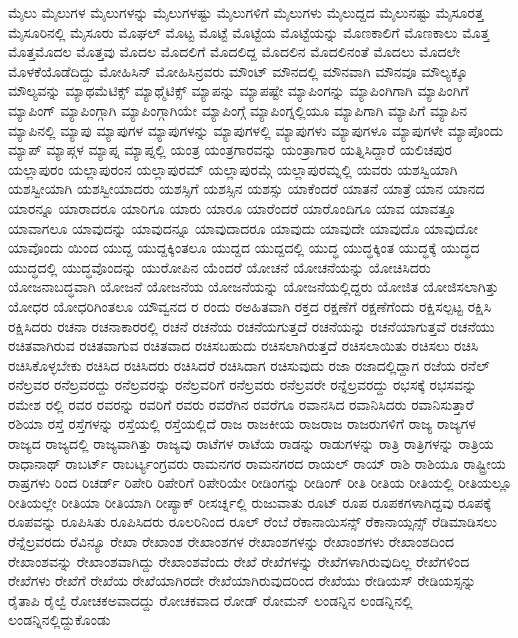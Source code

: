 {ಮೈಲು
ಮೈಲುಗಳ
ಮೈಲುಗಳನ್ನು
ಮೈಲುಗಳಷ್ಟು
ಮೈಲುಗಳಿಗೆ
ಮೈಲುಗಳು
ಮೈಲುದ್ದದ
ಮೈಲುನಷ್ಟು
ಮೈಸೂರತ್ತ
ಮೈಸೂರಿನಲ್ಲಿ
ಮೈಸೂರು
ಮೊಘಲ್
ಮೊಟ್ಟ
ಮೊಟ್ಟೆ
ಮೊಟ್ಟೆಯ
ಮೊಟ್ಟೆಯನ್ನು
ಮೊಣಕಾಲಿಗೆ
ಮೊಣಕಾಲು
ಮೊತ್ತ
ಮೊತ್ತಮೊದಲ
ಮೊತ್ತವು
ಮೊದಲ
ಮೊದಲಿಗೆ
ಮೊದಲಿದ್ದ
ಮೊದಲಿನ
ಮೊದಲಿನಂತೆ
ಮೊದಲು
ಮೊದಲೇ
ಮೊಳಕೆಯೊಡೆದಿದ್ದು
ಮೋಹಿಸಿನ್
ಮೋಹಿಸಿನ್ರವರು
ಮೌಂಟ್
ಮೌನದಲ್ಲಿ
ಮೌನವಾಗಿ
ಮೌನವೂ
ಮೌಲ್ಯಕ್ಕೂ
ಮೌಲ್ಯವನ್ನು
ಮ್ಯಾಥಮೆಟಿಕ್ಸ್
ಮ್ಯಾಥ್ಮೆಟಿಕ್ಸ್
ಮ್ಯಾಪನ್ನು
ಮ್ಯಾಪಷ್ಟೇ
ಮ್ಯಾಪಿಂಗನ್ನು
ಮ್ಯಾಪಿಂಗಿಗಾಗಿ
ಮ್ಯಾಪಿಂಗಿಗೆ
ಮ್ಯಾಪಿಂಗ್
ಮ್ಯಾಪಿಂಗ್ಗಾಗಿ
ಮ್ಯಾಪಿಂಗ್ಗಾಗಿಯೇ
ಮ್ಯಾಪಿಂಗ್ಗೆ
ಮ್ಯಾಪಿಂಗ್ನಲ್ಲಿಯೂ
ಮ್ಯಾಪಿಗಾಗಿ
ಮ್ಯಾಪಿಗೆ
ಮ್ಯಾಪಿನ
ಮ್ಯಾಪಿನಲ್ಲಿ
ಮ್ಯಾಪು
ಮ್ಯಾಪುಗಳ
ಮ್ಯಾಪುಗಳನ್ನು
ಮ್ಯಾಪುಗಳಲ್ಲಿ
ಮ್ಯಾಪುಗಳು
ಮ್ಯಾಪುಗಳೂ
ಮ್ಯಾಪುಗಳೇ
ಮ್ಯಾಪೊಂದು
ಮ್ಯಾಪ್
ಮ್ಯಾಪ್ಗಳ
ಮ್ಯಾಪ್ನ
ಮ್ಯಾಪ್ನಲ್ಲಿ
ಯಂತ್ರ
ಯಂತ್ರಗಾರವನ್ನು
ಯಂತ್ರಾಗಾರ
ಯತ್ನಿಸಿದ್ದಾರೆ
ಯಲಿಚಪುರ
ಯಲ್ಲಾಪುರಂ
ಯಲ್ಲಾಪುರಂನ
ಯಲ್ಲಾಪುರಮ್
ಯಲ್ಲಾಪುರಮ್ಗೆ
ಯಲ್ಲಾಪುರಮ್ನಲ್ಲಿ
ಯವರು
ಯಶಸ್ವಿಯಾಗಿ
ಯಶಸ್ವೀಯಾಗಿ
ಯಶಸ್ವೀಯಾದರು
ಯಶಸ್ಸಿಗೆ
ಯಶಸ್ಸಿನ
ಯಶಸ್ಸು
ಯಾಕೆಂದರೆ
ಯಾತನೆ
ಯಾತ್ರೆ
ಯಾನ
ಯಾನದ
ಯಾರನ್ನೂ
ಯಾರಾದರೂ
ಯಾರಿಗೂ
ಯಾರು
ಯಾರೂ
ಯಾರೆಂದರೆ
ಯಾರೊಂದಿಗೂ
ಯಾವ
ಯಾವತ್ತೂ
ಯಾವಾಗಲೂ
ಯಾವುದನ್ನು
ಯಾವುದನ್ನೂ
ಯಾವುದಾದರೂ
ಯಾವುದು
ಯಾವುದೇ
ಯಾವುದೊ
ಯಾವುದೋ
ಯಾವೊಂದು
ಯಿಂದ
ಯುದ್ದ
ಯುದ್ದಕ್ಕಿಂತಲೂ
ಯುದ್ದದ
ಯುದ್ದದಲ್ಲಿ
ಯುದ್ಧ
ಯುದ್ಧಕ್ಕಿಂತ
ಯುದ್ಧಕ್ಕೆ
ಯುದ್ಧದ
ಯುದ್ಧದಲ್ಲಿ
ಯುದ್ಧವೊಂದನ್ನು
ಯುರೋಪಿನ
ಯೆಂದರೆ
ಯೋಚನೆ
ಯೋಚನೆಯನ್ನು
ಯೋಚಿಸಿದರು
ಯೋಜನಾಬದ್ಧವಾಗಿ
ಯೋಜನೆ
ಯೋಜನೆಯ
ಯೋಜನೆಯನ್ನು
ಯೋಜನೆಯಲ್ಲಿದ್ದರು
ಯೋಜಿತ
ಯೋಜಿಸಲಾಗಿತ್ತು
ಯೋಧರ
ಯೋಧರಿಗಿಂತಲೂ
ಯೌವ್ವನದ
ರ
ರಂದು
ರಅಹಿತವಾಗಿ
ರಕ್ತದ
ರಕ್ಷಣೆಗೆ
ರಕ್ಷಣೆಗೆಂದು
ರಕ್ಷಿಸಲ್ಪಟ್ಟ
ರಕ್ಷಿಸಿ
ರಕ್ಷಿಸಿದರು
ರಚನಾ
ರಚನಾಕಾರರಲ್ಲಿ
ರಚನೆ
ರಚನೆಯ
ರಚನೆಯಗುತ್ತದೆ
ರಚನೆಯನ್ನು
ರಚನೆಯಾಗುತ್ತವೆ
ರಚನೆಯು
ರಚಿತವಾಗಿರುವ
ರಚಿತವಾಗುವ
ರಚಿತವಾದ
ರಚಿಸಬಹುದು
ರಚಿಸಲಾಗಿರುತ್ತದೆ
ರಚಿಸಲಾಯಿತು
ರಚಿಸಲು
ರಚಿಸಿ
ರಚಿಸಿಕೊಳ್ಳಬೇಕು
ರಚಿಸಿದ
ರಚಿಸಿದರು
ರಚಿಸಿದರೆ
ರಚಿಸಿದಾಗ
ರಚಿಸುವುದು
ರಜಾ
ರಜಾದಲ್ಲಿದ್ದಾಗ
ರಜೆಯ
ರನೆಲ್
ರನೆಲ್ರವರ
ರನೆಲ್ರವರದ್ದು
ರನೆಲ್ರವರನ್ನು
ರನೆಲ್ರವರಿಗೆ
ರನೆಲ್ರವರು
ರನೆಲ್ರವರೇ
ರನ್ನೆಲ್ರವರದ್ದು
ರಭಸಕ್ಕೆ
ರಭಸವನ್ನು
ರಮೇಶ
ರಲ್ಲಿ
ರವರ
ರವರನ್ನು
ರವರಿಗೆ
ರವರು
ರವರೆಗಿನ
ರವರೆಗೂ
ರವಾನಸಿದ
ರವಾನಿಸಿದರು
ರವಾನಿಸುತ್ತಾರೆ
ರಶಿಯಾ
ರಸ್ತೆ
ರಸ್ತೆಗಳನ್ನು
ರಸ್ತೆಯಲ್ಲಿ
ರಸ್ತೆಯಲ್ಲಿದೆ
ರಾಜ
ರಾಜಕೀಯ
ರಾಜರಾಜ
ರಾಜರುಗಳಿಗೆ
ರಾಜ್ಯ
ರಾಜ್ಯಗಳ
ರಾಜ್ಯದ
ರಾಜ್ಯದಲ್ಲಿ
ರಾಜ್ಯವಾಗಿತ್ತು
ರಾಜ್ಯವು
ರಾಟೆಗಳ
ರಾಟೆಯ
ರಾಡನ್ನು
ರಾಡುಗಳನ್ನು
ರಾತ್ರಿ
ರಾತ್ರಿಗಳನ್ನು
ರಾತ್ರಿಯ
ರಾಧಾನಾಥ್
ರಾಬರ್ಟ್
ರಾಬರ್ಟ್ಯಂಗ್ರವರು
ರಾಮನಗರ
ರಾಮನಗರದ
ರಾಯಲ್
ರಾಯ್
ರಾಶಿ
ರಾಶಿಯೂ
ರಾಷ್ಟ್ರೀಯ
ರಾಷ್ರಗಳು
ರಿಂದ
ರಿಚರ್ಡ್
ರಿಪೇರಿ
ರಿಪೇರಿಗೆ
ರಿಪೇರಿಯೇ
ರೀಡಿಂಗನ್ನು
ರೀಡಿಂಗ್
ರೀತಿ
ರೀತಿಯ
ರೀತಿಯಲ್ಲಿ
ರೀತಿಯಲ್ಲೂ
ರೀತಿಯಲ್ಲೇ
ರೀತಿಯಾ
ರೀತಿಯಾಗಿ
ರೀಪ್ಯಾಕ್
ರೀಸರ್ಚ್ನಲ್ಲಿ
ರುಜುವಾತು
ರೂಟ್
ರೂಪ
ರೂಪಕಗಳಾಗಿದ್ದವು
ರೂಪಕ್ಕೆ
ರೂಪವನ್ನು
ರೂಪಿಸಿತು
ರೂಪಿಸಿದರು
ರೂಲರಿನಿಂದ
ರೂಲ್
ರೆಂಬೆ
ರೆಕಾನಾಯಿಸನ್ಸ್
ರೆಕಾನಾಯ್ಸನ್ಸ್
ರೆಡಿಮಾಡಿಸಲು
ರೆನ್ನೆಲ್ರವರದು
ರೆವಿನ್ಯೂ
ರೇಖಾ
ರೇಖಾಂಶ
ರೇಖಾಂಶಗಳ
ರೇಖಾಂಶಗಳನ್ನು
ರೇಖಾಂಶಗಳು
ರೇಖಾಂಶದಿಂದ
ರೇಖಾಂಶವನ್ನು
ರೇಖಾಂಶವಾಗಿದ್ದು
ರೇಖಾಂಶವೆಂದು
ರೇಖೆ
ರೇಖೆಗಳನ್ನು
ರೇಖೆಗಳಾಗಿರುವುದಿಲ್ಲ
ರೇಖೆಗಳಿಂದ
ರೇಖೆಗಳು
ರೇಖೆಗೆ
ರೇಖೆಯ
ರೇಖೆಯಾಗಿರದೇ
ರೇಖೆಯಾಗಿರುವುದರಿಂದ
ರೇಖೆಯು
ರೇಡಿಯಸ್
ರೇಡಿಯಸ್ಸನ್ನು
ರೈತಾಪಿ
ರೈಲ್ವೆ
ರೋಚಕಅವಾದದ್ದು
ರೋಚಕವಾದ
ರೋಡ್
ರೋಮನ್
ಲಂಡನ್ನಿನ
ಲಂಡನ್ನಿನಲ್ಲಿ
ಲಂಡನ್ನಿನಲ್ಲಿದ್ದುಕೊಂಡು
}
